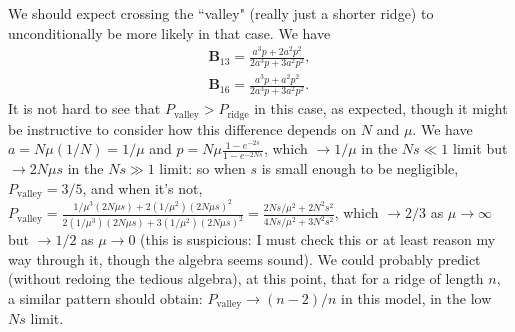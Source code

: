 \documentclass[11pt]{revtex4}
\begin{document}
We should expect crossing the ``valley" (really just a shorter ridge) to unconditionally be more likely in that case.
We have
\begin{align}
\textbf{B}_{13} = \frac{a^3p + 2a^2p^2}{2a^3p+3a^2p^2}, \\
\textbf{B}_{16} = \frac{a^3p + a^2p^2}{2a^3p+3a^2p^2}.
\end{align}
It is not hard to see that $P_{\mathrm{valley}} > P_{\mathrm{ridge}}$ in this case, as expected, though it might be instructive to consider how this difference depends on $N$ and $\mu$.
We have $a = N\mu(1/N) = 1/\mu$ and $p = N\mu \frac{1 - e^{-2s}}{1-e^{-2Ns}}$, which $\to 1/\mu$ in the $Ns \ll 1$ limit but $\to 2N\mu s$ in the $Ns \gg 1$ limit: so when $s$ is small enough to be negligible, $P_\mathrm{valley} = 3/5$, and when it's not, $P_\mathrm{valley} = \frac{1/\mu^3(2N\mu s) + 2(1/\mu^2)(2N\mu s)^2}{2(1/\mu^3)(2N\mu s) + 3(1/\mu^2)(2N\mu s)^2} = \frac{2Ns/\mu^2 + 2N^2s^2}{4Ns/\mu^2 + 3N^2s^2}$, which $\to 2/3$ as $\mu \to \infty$ but $\to 1/2$ as $\mu \to 0$ (this is suspicious: I must check this or at least reason my way through it, though the algebra seems sound).
We could probably predict (without redoing the tedious algebra), at this point, that for a ridge of length $n$, a similar pattern should obtain: $P_\mathrm{valley} \to (n-2)/n$ in this model, in the low $Ns$ limit.
\end{document}
